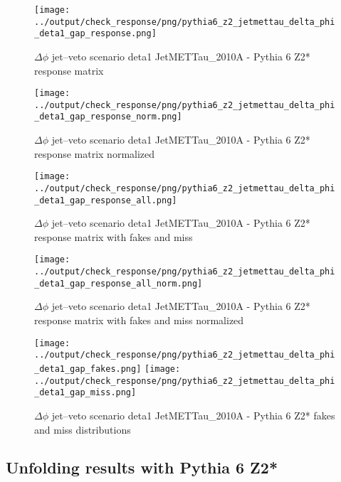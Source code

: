 \documentclass[11pt]{book}
\begin{document}
\begin{figure}[ht]
\centering
\texttt{[image: ../output/check\_response/png/pythia6\_z2\_jetmettau\_delta\_phi\_deta1\_gap\_response.png]}
\caption{$\Delta\phi$ jet--veto scenario deta1 JetMETTau\_2010A - Pythia 6 Z2* response matrix}
\label{p6_jetmettau_delta_phi_deta1_gap_response}
\end{figure}

\begin{figure}[ht]
\centering
\texttt{[image: ../output/check\_response/png/pythia6\_z2\_jetmettau\_delta\_phi\_deta1\_gap\_response\_norm.png]}
\caption{$\Delta\phi$ jet--veto scenario deta1 JetMETTau\_2010A - Pythia 6 Z2* response matrix normalized}
\label{p6_jetmettau_delta_phi_deta1_gap_response_norm}
\end{figure}

\begin{figure}[ht]
\centering
\texttt{[image: ../output/check\_response/png/pythia6\_z2\_jetmettau\_delta\_phi\_deta1\_gap\_response\_all.png]}
\caption{$\Delta\phi$ jet--veto scenario deta1 JetMETTau\_2010A - Pythia 6 Z2* response matrix with fakes and miss}
\label{p6_jetmettau_delta_phi_deta1_gap_response_all}
\end{figure}

\begin{figure}[ht]
\centering
\texttt{[image: ../output/check\_response/png/pythia6\_z2\_jetmettau\_delta\_phi\_deta1\_gap\_response\_all\_norm.png]}
\caption{$\Delta\phi$ jet--veto scenario deta1 JetMETTau\_2010A - Pythia 6 Z2* response matrix with fakes and miss normalized}
\label{p6_jetmettau_delta_phi_deta1_gap_response_all_norm}
\end{figure}

\begin{figure}[ht]
\centering
\texttt{[image: ../output/check\_response/png/pythia6\_z2\_jetmettau\_delta\_phi\_deta1\_gap\_fakes.png]}
\texttt{[image: ../output/check\_response/png/pythia6\_z2\_jetmettau\_delta\_phi\_deta1\_gap\_miss.png]}
\caption{$\Delta\phi$ jet--veto scenario deta1 JetMETTau\_2010A - Pythia 6 Z2* fakes and miss distributions}
\label{p6_jetmettau_delta_phi_deta1_gap_fakesmiss}
\end{figure}


\clearpage
\subsection{Unfolding results with Pythia 6 Z2*}
\end{document}
